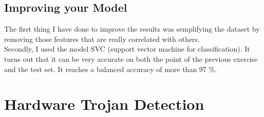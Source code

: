 \documentclass[unicode,11pt,a4paper,oneside,numbers=endperiod,openany]{scrartcl}
\begin{document}
\subsection{Improving your Model}
The first thing I have done to improve the results was semplifying the dataset by removing those features that are really correlated with others. \\
Secondly, I used the model SVC (support vector machine for classification). It turns out that it can be very accurate on both the point of the previous exercise and the test set. It reaches a balanced accuracy of more than 97 \%. 
\section{Hardware Trojan Detection}
\end{document}
